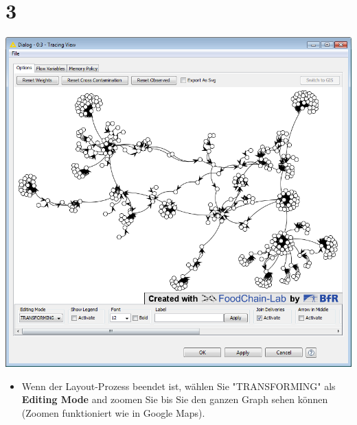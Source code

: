 \documentclass{beamer}
\begin{document}
\section{3}
\begin{frame}
	\begin{center}
  		\includegraphics[height=0.6\textheight]{3.png}
	\end{center}
	\begin{itemize}
		\item Wenn der Layout-Prozess beendet ist, wählen Sie "TRANSFORMING" als \textbf{Editing Mode} and zoomen Sie bis Sie den ganzen Graph sehen können (Zoomen funktioniert wie in Google Maps).
	\end{itemize}
\end{frame}
\end{document}
